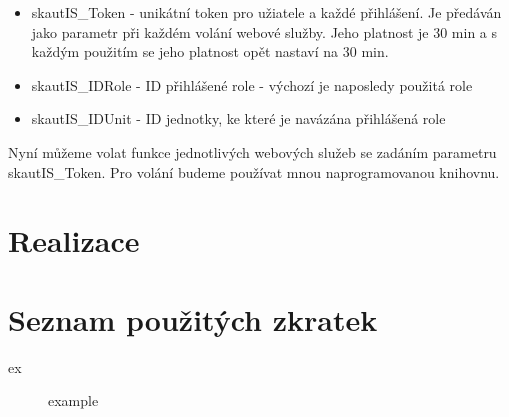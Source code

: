 \documentclass[thesis=B,czech]{FITthesis}[2011/06/14]
\begin{document}
\begin{itemize}
	\item skautIS\_Token - unikátní token pro užiatele a každé přihlášení. Je předáván jako parametr při každém volání webové služby. Jeho platnost je 30 min a s každým použitím se jeho platnost opět nastaví na 30 min. 
	\item skautIS\_IDRole - ID přihlášené role - výchozí je naposledy použitá role 
	\item skautIS\_IDUnit - ID jednotky, ke které je navázána přihlášená role 
\end{itemize}

Nyní můžeme volat funkce jednotlivých webových služeb se zadáním parametru skautIS\_Token. Pro volání budeme používat mnou naprogramovanou knihovnu. 


\chapter{Realizace}

\begin{conclusion}
\end{conclusion}




\appendix

\chapter{Seznam použitých zkratek}
\begin{description}
	\item[ex] example
\end{description}


% 
% 
% 
\end{document}
